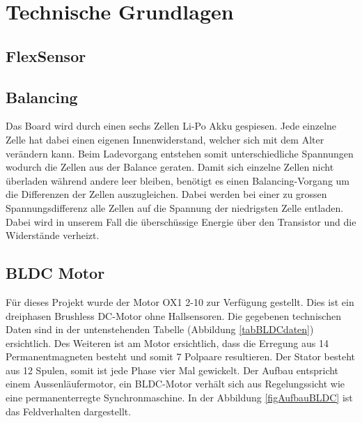 \chapter{Technische Grundlagen}
\label{TechnischeGrundlagen}
\section{FlexSensor}
\label{tGl_FlexSensor}
\section{Balancing}
\label{tGl_Balancing}
Das Board wird durch einen sechs Zellen Li-Po Akku gespiesen. Jede einzelne Zelle hat dabei einen eigenen Innenwiderstand, welcher sich mit dem Alter verändern kann. Beim Ladevorgang entstehen somit unterschiedliche Spannungen wodurch die Zellen aus der Balance geraten.
Damit sich einzelne Zellen nicht überladen während andere leer bleiben, benötigt es einen Balancing-Vorgang um die Differenzen der Zellen auszugleichen. 
Dabei werden bei einer zu grossen Spannungsdifferenz alle Zellen auf die Spannung der niedrigsten Zelle entladen. Dabei wird in unserem Fall die überschüssige Energie über den Transistor und die Widerstände verheizt.

\section{BLDC Motor}
\label{tGl_BLDC}

Für dieses Projekt wurde der Motor OX1 2-10 zur Verfügung gestellt. Dies ist ein dreiphasen Brushless DC-Motor ohne Hallsensoren. Die gegebenen technischen Daten sind in der untenstehenden Tabelle (Abbildung \ref{tabBLDCdaten}) ersichtlich. 
Des Weiteren ist am Motor ersichtlich, dass die Erregung aus 14 Permanentmagneten besteht und somit 7 Polpaare resultieren. Der Stator besteht aus 12 Spulen, somit ist jede Phase vier Mal gewickelt.
Der Aufbau entspricht einem Aussenläufermotor, ein BLDC-Motor verhält sich aus Regelungssicht wie eine permanenterregte Synchronmaschine. In der Abbildung \ref{figAufbauBLDC} ist das Feldverhalten dargestellt.\\

